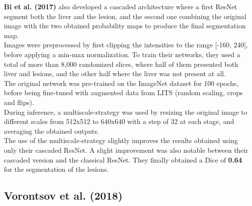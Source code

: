 \textbf{Bi et al. (2017)} also developed a cascaded architecture where a
first ResNet segment both the liver and the lesion, and the second one
combining the original image with the two obtained probability maps to
produce the final segmentation map.\\
Images were preprocessed by first clipping the intensities to the range
{[}-160, 240{]}, before applying a min-max normalization. To train their
networks, they used a total of more than 8,000 randomized slices, where
half of them presented both liver and lesions, and the other half where
the liver was not present at all.\\
The original network was pre-trained on the ImageNet dataset for 100
epochs, before being fine-tuned with augmented data from LITS (random
scaling, crops and flips).\\
During inference, a multiscale-strategy was used by resizing the
original image to different scales from 512x512 to 640x640 with a step
of 32 at each stage, and averaging the obtained outputs.\\
The use of the multiscale-strategy slightly improves the results
obtained using only their cascaded ResNet. A slight improvement was also
notable between their cascaded version and the classical ResNet. They
finally obtained a Dice of \textbf{0.64} for the segmentation of the
lesions.

\subsection*{Vorontsov et al. (2018)}\label{vorontsov-et-al.-2018}

